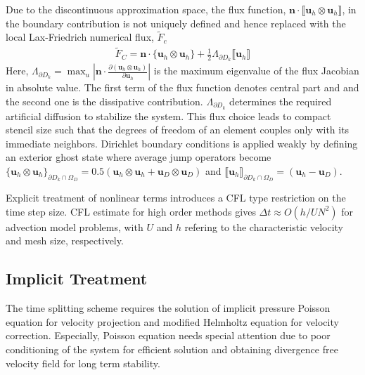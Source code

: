 \documentclass[11pt,a4paper,twoside]{article}
\begin{document}
	
	Due to the discontinuous approximation space, the flux function, $\mathbf{n}\cdot   \llbracket \mathbf{u}_h \otimes\mathbf{u}_h\rrbracket $, in the boundary contribution is not uniquely defined and hence replaced  with the local Lax-Friedrich numerical flux, $ \tilde{F}_c $
	\begin{equation}
	\label{Eq.NonlinearTermDiscretization_2}
	\begin{aligned}
	\tilde{F}_{C} = \mathbf{n} \cdot  \lbrace \mathbf{u}_h \otimes\mathbf{u}_h \rbrace  + \frac{1}{2}\Lambda_{\partial D_k} \llbracket  \mathbf{u}_h  \rrbracket 
	\end{aligned}
	\end{equation}
	Here, $ \Lambda_{\partial D_k} = \max_u | \mathbf{n}\cdot\frac{\partial \left(\mathbf{u}_h \otimes\mathbf{u}_h\right) }{\partial \mathbf{u}_h}|$ is the maximum eigenvalue of the flux Jacobian in absolute value. The first term of the flux function denotes central part and and the second one is the dissipative contribution.  $ \Lambda_{\partial D_k} $ determines the required artificial diffusion to stabilize the system. This flux choice leads to compact stencil size such that the degrees of freedom of an element couples only with its immediate neighbors. Dirichlet boundary conditions is applied weakly by defining an exterior ghost state where average jump operators become $ \{  \mathbf{u}_h \otimes\mathbf{u}_h\}_{\partial D_k \cap \Omega_D} =0.5 \left( \mathbf{u}_h \otimes\mathbf{u}_h +  \mathbf{u}_D \otimes\mathbf{u}_D\right)  $ and $ \llbracket  \mathbf{u}_h \rrbracket_{\partial D_k \cap \Omega_D} =\left( \mathbf{u}_h -  \mathbf{u}_D \right)  $. 
	
	
	Explicit treatment of nonlinear terms introduces a CFL type restriction on the time step size. CFL estimate for high order methods gives $ \Delta t \approx O(h/U N^2)$  for advection model problems, with $ U $ and $ h $ refering to the characteristic velocity and mesh size, respectively.
	\subsection{Implicit Treatment}
	
	
	
	The time splitting scheme requires the solution of implicit pressure Poisson equation for velocity projection and  modified Helmholtz equation for velocity correction. Especially, Poisson equation needs special attention due to poor conditioning of  the system for  efficient solution and obtaining  divergence free velocity field for long term stability. 
	
\end{document}
